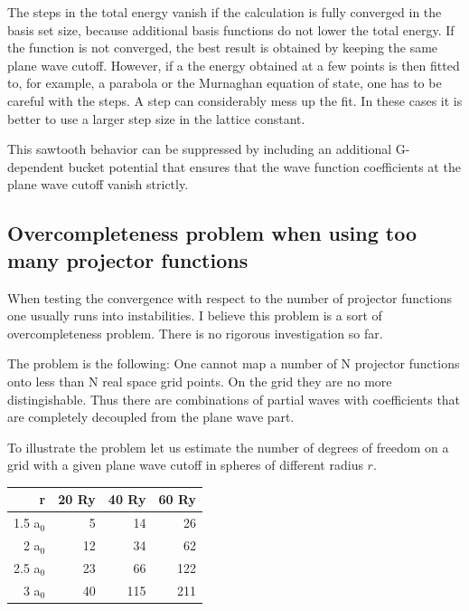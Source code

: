 \documentclass[final,12pt]{article}
\begin{document}
{{{{{{The steps in the total energy vanish if the calculation is fully converged in
the basis set size, because additional basis functions do not lower the total
energy. If the function is not converged, the best result is obtained by
keeping the same plane wave cutoff. However, if a the energy obtained at a few
points is then fitted to, for example, a parabola or the Murnaghan equation of
state\cite{murnaghan44_pnas30_244}, one has to be careful with the steps. A
step can considerably mess up the fit. In these cases it is better to use a
larger step size in the lattice constant.

This sawtooth behavior can be suppressed by including an additional
G-dependent bucket potential that ensures that the wave function
coefficients at the plane wave cutoff vanish strictly.

\subsection{Overcompleteness problem when using too many projector functions}
When testing the convergence with respect to the number of projector
functions one usually runs into instabilities. I believe this problem
is a sort of overcompleteness problem. There is no rigorous
investigation so far.

The problem is the following: One cannot map a number of N projector
functions onto less than N real space grid points. On the grid they
are no more distingishable. Thus there are combinations of partial
waves with coefficients that are completely decoupled from the plane
wave part. 

To illustrate the problem let us estimate the number of degrees of
freedom on a grid with a given plane wave cutoff in spheres of
different radius $r$.

\begin{center}
\begin{tabular}{|r|r|r|r|}
\hline
r      & 20 Ry & 40 Ry & 60 Ry \\
\hline
1.5 a$_0$ &  5 &  14 &  26 \\
2   a$_0$& 12 &  34 &  62 \\
2.5 a$_0$& 23 &  66 &  122\\
3   a$_0$& 40 & 115 & 211 \\
\hline
\end{tabular}
\end{center}

}}}}}}
\end{document}
